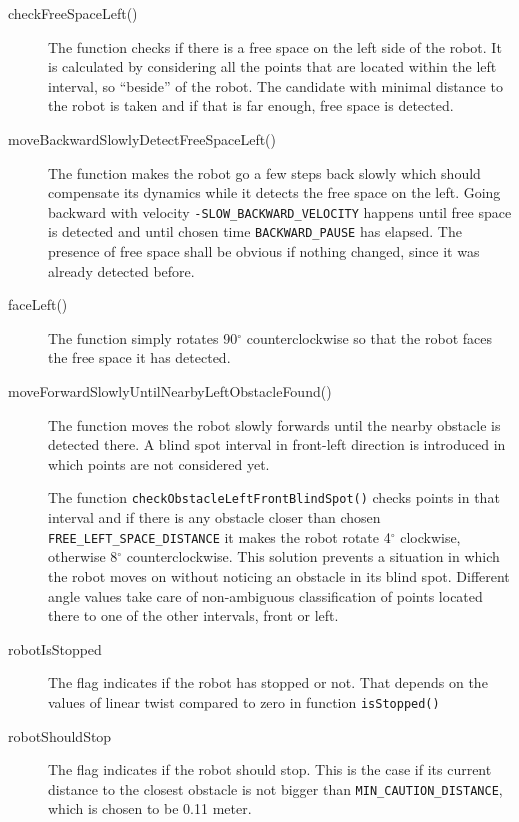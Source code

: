 \begin{description}

\item[checkFreeSpaceLeft()] The function checks if there is a free space on the left side of the robot. It is calculated by considering all the points that are located within the left interval, so ``beside'' of the robot. The candidate with minimal distance to the robot is taken and if that is far enough, free space is detected.

\item[moveBackwardSlowlyDetectFreeSpaceLeft()] The function makes the robot go a few steps back slowly which should compensate its dynamics while it detects the free space on the left. Going backward with velocity  \texttt{-SLOW\_BACKWARD\_VELOCITY} happens until free space is detected and until chosen time \texttt{BACKWARD\_PAUSE} has elapsed. The presence of free space shall be obvious if nothing changed, since it was already detected before.

\item[faceLeft()] The function simply rotates 90$^{\circ}$ counterclockwise so that the robot faces the free space it has detected.

\item[moveForwardSlowlyUntilNearbyLeftObstacleFound()] The function moves the robot slowly forwards until the nearby obstacle is detected there. A blind spot interval in front-left direction is introduced in which points are not considered yet.

The function \texttt{checkObstacleLeftFrontBlindSpot()} checks points in that interval and if there is any obstacle closer than chosen \texttt{FREE\_LEFT\_SPACE\_DISTANCE} it makes the robot rotate 4$^{\circ}$ clockwise, otherwise 8$^{\circ}$ counterclockwise. This solution prevents a situation in which the robot moves on without noticing an obstacle in its blind spot. Different angle values take care of non-ambiguous classification of points located there to one of the other intervals, front or left.

\item[robotIsStopped] The flag indicates if the robot has stopped or not. That depends on the values of linear twist compared to zero in function \texttt{isStopped()}

\item[robotShouldStop] The flag indicates if the robot should stop. This is the case if its current distance to the closest obstacle is not bigger than \texttt{MIN\_CAUTION\_DISTANCE}, which is chosen to be 0.11 meter.




\end{description}
